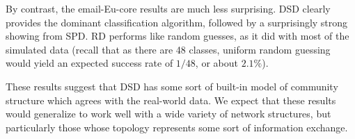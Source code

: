 By contrast, the email-Eu-core results are much less surprising. DSD clearly provides the dominant
classification algorithm, followed by a surprisingly strong showing from SPD. RD performs like
random guesses, as it did with most of the simulated data (recall that as there are 48 classes,
uniform random guessing would yield an expected success rate of $1/48$, or about $2.1\%$).

These results suggest that DSD has some sort of built-in model of community structure which agrees
with the real-world data. We expect that these results would generalize to work well with a wide
variety of network structures, but particularly those whose topology represents some sort of
information exchange.


